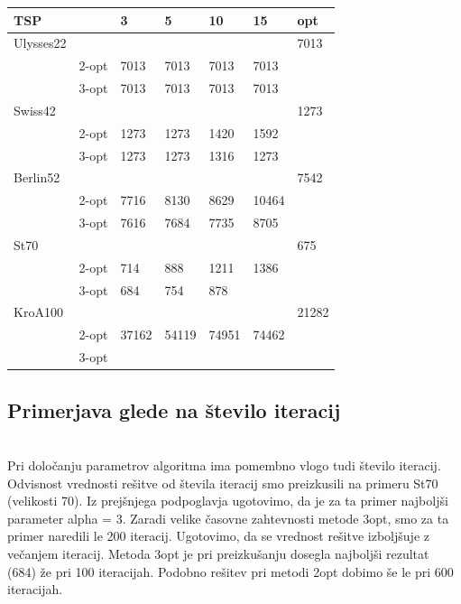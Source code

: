 \documentclass[12pt,a4paper]{amsart}
\theoremstyle{definition} %
\theoremstyle{plain} %
\begin{document}
\begin{table}[H]
\begin{tabular}{lllllll}
\rowcolor[HTML]{FFCCC9} 
TSP       &      & 3 & 5 & 10 & 15 &opt \\ \hline
Ulysses22 &      &   &   &    &  &7013  \\
          & 2-opt & 7013  &  7013 & 7013   & 7013   &\\
          & 3-opt &   7013&  7013 &  7013  &  7013 & \\
Swiss42   &      &   &   &    &   &1273 \\
	& 2-opt &   1273&  1273 &   1420 &  1592 & \\
          & 3-opt &  1273 &  1273 & 1316   &  1273 & \\
Berlin52 &      &   &   &    &   &7542 \\
	 & 2-opt &  7716 & 8130 &   8629 &  10464 & \\
          & 3-opt &  7616 &  7684 &  7735  & 8705  & \\
St70      &      &   &   &    &  & 675 \\
	& 2-opt &  714 &  888 &   1211 &  1386 & \\
          & 3-opt &  684 &  754 &   878 &   & \\
KroA100   &      &   &   &    &  &21282  \\
	& 2-opt &  37162 &  54119 &   74951 &   74462& \\
          & 3-opt &   &   &    &   &
\end{tabular}
\end{table}


\subsection{Primerjava glede na število iteracij} ~\\

Pri določanju parametrov algoritma ima pomembno vlogo tudi število iteracij. Odvisnost vrednosti rešitve od števila iteracij smo preizkusili na primeru St70 (velikosti 70). Iz prejšnjega podpoglavja ugotovimo, da je za ta primer najboljši parameter alpha = 3. Zaradi velike časovne zahtevnosti metode 3opt, smo za ta primer naredili le 200 iteracij. Ugotovimo, da se vrednost rešitve izboljšuje z večanjem iteracij. Metoda 3opt je pri preizkušanju dosegla najboljši rezultat (684) že pri 100 iteracijah. Podobno rešitev pri metodi 2opt dobimo še le pri 600 iteracijah. 
\end{document}
